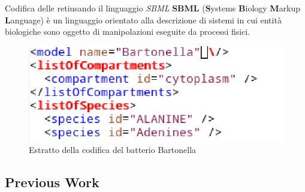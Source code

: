 \documentclass{beamer}
\begin{document}
\begin{frame}{Codifica delle reti}{usando il linguaggio \emph{SBML}}
  \textbf{SBML} (\textbf{S}ystems \textbf{B}iology \textbf{M}arkup
  \textbf{L}anguage) \`e un linguaggio orientato alla descrizione di
  sistemi in cui entit\`a biologiche sono oggetto di manipolazioni
  eseguite da processi fisici.
  \begin{figure}
    \includegraphics[scale=.6]{images/sbml-code-chunk.eps}
    \caption{Estratto della codifica del batterio Bartonella}
  \end{figure}
\end{frame}



\subsection{Previous Work}
\end{document}
